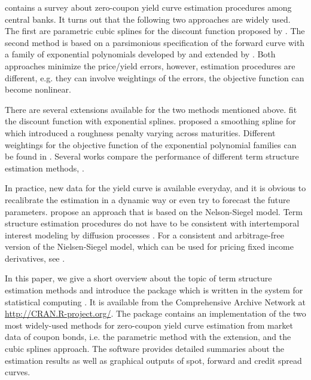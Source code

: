 \cite{BIS2005} contains a survey about zero-coupon yield curve estimation procedures among central banks. It turns out that the following two approaches are widely used. The first are parametric cubic splines for the discount function proposed by \cite{McCulloch1971, McCulloch1975}. The second method is based on a parsimonious specification of the forward curve with a family of exponential polynomials developed by \cite{Nelson1987} and extended by \cite{Svensson1994}. Both approaches minimize the price/yield errors, however, estimation procedures are different, e.g. they can involve weightings of the errors, the objective function can become nonlinear.

There are several extensions available for the two methods mentioned above. \cite{Vasicek1982} fit the discount function with exponential splines. \cite{Fisher1995} proposed a smoothing spline for which \cite{Waggoner1997} introduced a roughness penalty varying across maturities. Different weightings for the objective function of the exponential polynomial families can be found in \cite{Soederlind1997}. Several works compare the performance of different term structure estimation methods, \citep[see e.g.][]{Bliss1997, Bolder1999, Ioannides2003}.

In practice, new data for the yield curve is available everyday, and it is obvious to recalibrate the estimation in a dynamic way or even try to forecast the future parameters. \cite{Diebold2006} propose an approach that is based on the Nelson-Siegel model. Term structure estimation procedures do not have to be consistent with intertemporal interest modeling by diffusion processes \citep[see, e.g.][]{Bjoerk1999, Filipovic1999}. For a consistent and arbitrage-free version of the Nielsen-Siegel model, which can be used for pricing fixed income derivatives, see \cite{Krippner2006}.   

In this paper, we give a short overview about the topic of term structure estimation methods and introduce the package  which is written in the  system for statistical computing \citep{R2008}. It is available from the Comprehensive  Archive Network at \url{http://CRAN.R-project.org/}. The package contains an implementation of the two most widely-used methods for zero-coupon yield curve estimation from market data of coupon bonds, i.e. the parametric \cite{Nelson1987} method with the \cite{Svensson1994} extension, and the \cite{McCulloch1975} cubic splines approach. The software provides detailed summaries about the estimation results as well as graphical outputs of spot, forward and credit spread curves.

